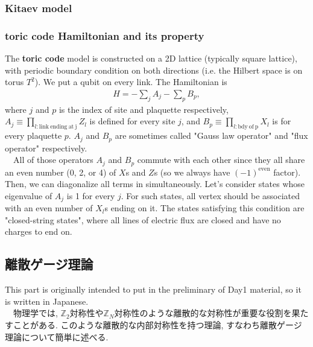 \documentclass{ltjsarticle}
\theoremstyle{mystyle} %
\numberwithin{equation}{section}
\begin{document}
\subsubsection{Kitaev model}
\subsubsection{toric code Hamiltonian and its property}
The \textbf{toric code} model is constructed on 
a 2D lattice (typically square lattice), with periodic boundary condition on both directions 
(i.e. the Hilbert space is on torus $T^2$). 
We put a qubit on every link. 
The Hamiltonian is 
\begin{align}
    H=-\sum_j A_j - \sum_p B_p, 
    \label{TCmodel}
\end{align}
where $j$ and $p$ is the index of site and plaquette respectively, 
$A_{j}\equiv \prod_{l:\mathrm{link~ending~at~j}} Z_l$ is defined for every site $j$, 
and $B_{p}\equiv \prod_{l:\mathrm{bdy~of~p}} X_l$ is for every plaquette $p$. 
$A_j$ and $B_p$ are sometimes called "Gauss law operator" and "flux operator" respectively. \\
　All of those operators $A_j$ and $B_p$ commute with each other since 
they all share an even number (0, 2, or 4) of $X$s and $Z$s 
(so we always have $(-1)^{\mathrm{even}}$ factor). 
Then, we can diagonalize all terms in \label{TCmodel} simultaneously. 
Let's consider states whose eigenvalue of $A_j$ is 1 for every $j$. 
For such states, all vertex should be associated with an even number of $X_l$s ending on it. 
The states satisfying this condition are "closed-string states", 
where all lines of electric flux are closed and have no charges to end on. 


\subsection{離散ゲージ理論}
\noindent
\small
This part is originally intended to put in the preliminary of Day1 material, 
so it is written in Japanese. \\
\normalsize
　物理学では, $\mathbb{Z}_2$対称性や$\mathbb{Z}_{N}$対称性のような離散的な対称性が重要な役割を果たすことがある. 
このような離散的な内部対称性を持つ理論, すなわち離散ゲージ理論について簡単に述べる. 
\end{document}
